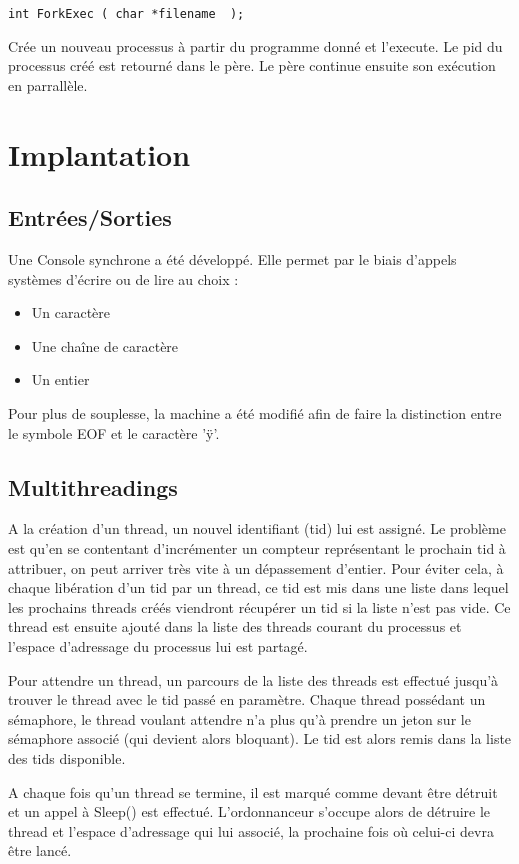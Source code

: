 \documentclass{article}
\begin{document}
\begin{verbatim}
int ForkExec ( char *filename  );
\end{verbatim}
Crée un nouveau processus à partir du programme donné et l'execute. Le pid du processus créé est retourné dans le père.
Le père continue ensuite son exécution en parrallèle.

\section{Implantation}
\subsection{Entrées/Sorties}
Une Console synchrone a été développé. Elle permet par le biais d'appels systèmes d'écrire ou de lire au choix :

\begin{itemize}
\item Un caractère
\item Une chaîne de caractère
\item Un entier
\end{itemize}

Pour plus de souplesse, la machine a été modifié afin de faire la distinction entre le symbole EOF et le caractère 'ÿ'.

\subsection{Multithreadings}
A la création d'un thread, un nouvel identifiant (tid) lui est assigné. Le problème est qu'en se contentant d'incrémenter un compteur représentant le prochain tid à attribuer, on peut arriver très vite à un dépassement d'entier. Pour éviter cela, à chaque libération d'un tid par un thread, ce tid est mis dans une liste dans lequel les prochains threads créés viendront récupérer un tid si la liste n'est pas vide.
Ce thread est ensuite ajouté dans la liste des threads courant du processus et l'espace d'adressage du processus lui est partagé.

Pour attendre un thread, un parcours de la liste des threads est effectué jusqu'à trouver le thread avec le tid passé en paramètre. Chaque thread possédant un sémaphore, le thread voulant attendre n'a plus qu'à prendre un jeton sur le sémaphore associé (qui devient alors bloquant). Le tid est alors remis dans la liste des tids disponible.

A chaque fois qu'un thread se termine, il est marqué comme devant être détruit et un appel à Sleep() est effectué.
L'ordonnanceur s'occupe alors de détruire le thread et l'espace d'adressage qui lui associé, la prochaine fois où celui-ci devra être lancé.
\end{document}
